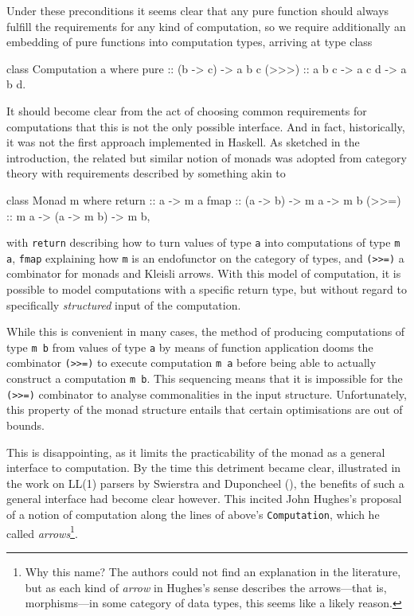 Under these preconditions it seems clear that any pure function should always
fulfill the requirements for any kind of computation, so we require additionally
an embedding of pure functions into computation types, arriving at type class

\begin{code}
  class Computation a where
      pure   :: (b -> c) -> a b c
      (>>>)  :: a b c -> a c d -> a b d\textrm{.}
\end{code}

It should become clear from the act of choosing common requirements for
computations that this is not the only possible interface. And in fact,
historically, it was not the first approach implemented in Haskell. As sketched
in the introduction, the related but similar notion of monads was adopted from
category theory with requirements described by something akin to

\begin{code}
  class Monad m where
      return :: a -> m a
      fmap   :: (a -> b) -> m a -> m b
      (>>=)  :: m a -> (a -> m b) -> m b\textrm{,}
\end{code}

with \verb|return| describing how to turn values of type \verb|a| into
computations of type \verb|m a|, \verb|fmap| explaining how \verb|m| is an
endofunctor on the category of types, and \verb|(>>=)| a combinator for monads
and Kleisli arrows. With this model of computation, it is possible to model
computations with a specific return type, but without regard to specifically
\emph{structured} input of the computation.

While this is convenient in many cases, the method of producing computations of
type \verb|m b| from values of type \verb|a| by means of function application
dooms the combinator \verb|(>>=)| to execute computation \verb|m a| before being
able to actually construct a computation \verb|m b|. This sequencing means that
it is impossible for the \verb|(>>=)| combinator to analyse commonalities in
the input structure. Unfortunately, this property of the monad structure entails
that certain optimisations are out of bounds.

This is disappointing, as it limits the practicability of the monad as a general
interface to computation. By the time this detriment became clear, illustrated
in the work on LL(1) parsers by Swierstra and Duponcheel (\cite{swierstra}), the
benefits of such a general interface had become clear however. This incited John
Hughes's proposal of a notion of computation along the lines of above's
\verb|Computation|, which he called \emph{arrows}\footnote{Why this name? The
authors could not find an explanation in the literature, but as each kind of
\emph{arrow} in Hughes's sense describes the arrows---that is, morphisms---in
some category of data types, this seems like a likely reason.}.

